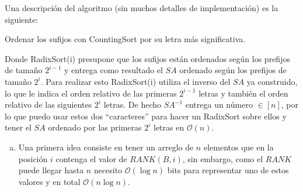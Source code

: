 \documentclass[dcc,uchile]{fcfmcourse}
\theoremstyle{plain}
\theoremstyle{definition}
\begin{document}
\begin{problems}
Una descripción del algoritmo (sin muchos detalles de implementación) es la siguiente:\\
\begin{algorithm}[H]
        \SetAlgoLined
        Ordenar los sufijos con CountingSort por su letra más significativa.\\
\end{algorithm}
Donde RadixSort(i) presupone que los sufijos están ordenados según los prefijos de tamaño $2^{i-1}$ y entrega como resultado el $SA$ ordenado según los prefijos de tamaño $2^i$. Para realizar esto RadixSort(i) utiliza el inverso del $SA$ ya construido, lo que le indica el orden relativo de las primeras $2^{i-1}$ letras y también el orden relativo de las siguientes $2^{i}$ letras. De hecho $SA^{-1}$ entrega un número $\in [n]$, por lo que puedo usar estos dos ``caracteres'' para hacer un RadixSort sobre ellos y tener el $SA$ ordenado por las primeras $2^{i}$ letras en $\mathcal{O}(n)$. \happy
\item 
\begin{enumerate}[a)]
\item Una primera idea consiste en tener un arreglo de $n$ elementos que en la posición $i$ contenga el valor de $RANK(B,i)$, sin embargo, como el $RANK$ puede llegar hasta $n$ necesito $\mathcal{O}(\log n)$ bits para representar uno de estos valores y en total $\mathcal{O}(n\log n)$. \crying\\


\end{enumerate}
\end{problems}
\end{document}
